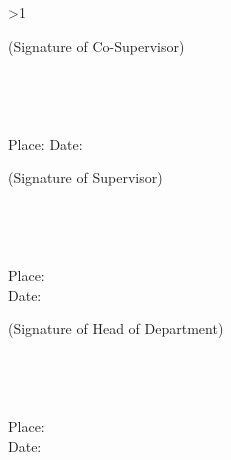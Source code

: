 \vspace{0.2cm}

\ifnum\GetHasCoSupervisor>1\relax
\begin{flushleft}
(Signature of Co-Supervisor)\\[0.1cm]
\textbf{\GetCoSupervisor}\\
\GetCoSupervisorDesignation\\
\GetCoSupervisorDept\\
\GetCollege\\[0.1cm]
Place: \underline{\hspace{3cm}} \hspace{2cm} Date: \underline{\hspace{3cm}}
\end{flushleft}
\vspace{0.3cm}
\fi

\begin{minipage}[t]{0.47\textwidth}
\begin{flushleft}
(Signature of Supervisor)\\[0.2cm]
\textbf{\GetSupervisor}\\
\GetSupervisorDesignation\\
\GetSupervisorDept\\
\GetCollege\\[0.1cm]
Place: \underline{\hspace{2.5cm}}\\
Date: \underline{\hspace{2.5cm}}
\end{flushleft}
\end{minipage}%
\hfill
\begin{minipage}[t]{0.47\textwidth}
\begin{flushright}
(Signature of Head of Department)\\[0.2cm]
\textbf{\GetHoD}\\
\GetHoDDesignation\\
\GetHoDDept\\
\GetCollege\\[0.1cm]
Place: \underline{\hspace{2.5cm}}\\
Date: \underline{\hspace{2.5cm}}
\end{flushright}
\end{minipage}
\clearpage

\cleardoublepage
